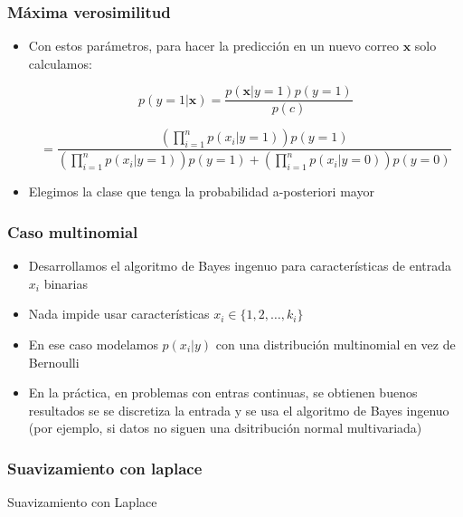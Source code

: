 \documentclass{beamer}
\begin{document}
\begin{frame}
\frametitle{Máxima verosimilitud}

\begin{itemize}
\item Con estos parámetros, para hacer la predicción en un nuevo correo $ \boldsymbol{x}$ solo calculamos: 

\begin{equation*}
p(y=1\vert \boldsymbol{x})=  \frac{p(\boldsymbol{x}\vert y=1) p(y=1)}{p(c)}
\end{equation*}

\begin{equation*}
=\frac{\left(  \prod_{i=1}^{n} p(x_i\vert y=1) \right)p(y=1) }{\left(  \prod_{i=1}^{n} p(x_i\vert y=1) \right) p(y=1) + \left( \prod_{i=1}^{n} p(x_i\vert y=0) \right) p(y=0) }
\end{equation*}

\item Elegimos la clase que tenga la probabilidad a-posteriori mayor

\end{itemize}
\end{frame}
\begin{frame}
\frametitle{Caso multinomial}
\begin{itemize}
\item Desarrollamos el algoritmo de Bayes ingenuo para características de entrada $x_{i}$ binarias
\item Nada impide usar características $x_{i}\in \lbrace1, 2, \ldots, k_{i}\rbrace$
\item En ese caso modelamos $p(x_{i}\vert y)$ con una distribución multinomial en vez de Bernoulli
\item En la práctica, en problemas con entras continuas, se obtienen buenos resultados se se discretiza  la entrada y se usa el algoritmo de Bayes ingenuo (por ejemplo, si datos no siguen una dsitribución normal multivariada)
\end{itemize}

\end{frame}
\begin{frame}
\frametitle{Suavizamiento con laplace}
\begin{center}
Suavizamiento con Laplace
\end{center}


\end{frame}
\end{document}
